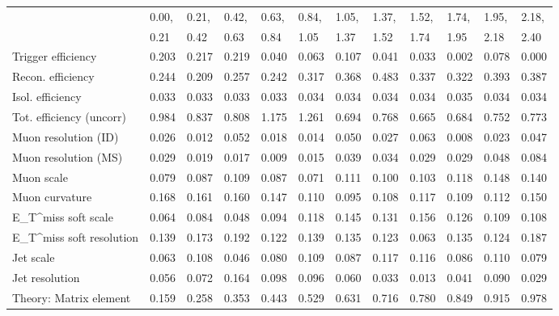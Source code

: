\begin{tabular}{l|p{0.6cm}p{0.6cm}p{0.6cm}p{0.6cm}p{0.6cm}p{0.6cm}p{0.6cm}p{0.6cm}p{0.6cm}p{0.6cm}p{0.6cm}}
\hline
   & 0.00, & 0.21, & 0.42, & 0.63, & 0.84, & 1.05, & 1.37, & 1.52, & 1.74, & 1.95, & 2.18,  \\ 
   & 0.21 & 0.42 & 0.63 & 0.84 & 1.05 & 1.37 & 1.52 & 1.74 & 1.95 & 2.18 & 2.40  \\ 
\hline
Trigger efficiency                       & 0.203 & 0.217 & 0.219 & 0.040 & 0.063 & 0.107 & 0.041 & 0.033 & 0.002 & 0.078 & 0.000 \\
Recon. efficiency                        & 0.244 & 0.209 & 0.257 & 0.242 & 0.317 & 0.368 & 0.483 & 0.337 & 0.322 & 0.393 & 0.387 \\
Isol. efficiency                         & 0.033 & 0.033 & 0.033 & 0.033 & 0.034 & 0.034 & 0.034 & 0.034 & 0.035 & 0.034 & 0.034 \\
Tot. efficiency (uncorr)                 & 0.984 & 0.837 & 0.808 & 1.175 & 1.261 & 0.694 & 0.768 & 0.665 & 0.684 & 0.752 & 0.773 \\
Muon resolution (ID)                     & 0.026 & 0.012 & 0.052 & 0.018 & 0.014 & 0.050 & 0.027 & 0.063 & 0.008 & 0.023 & 0.047 \\
Muon resolution (MS)                     & 0.029 & 0.019 & 0.017 & 0.009 & 0.015 & 0.039 & 0.034 & 0.029 & 0.029 & 0.048 & 0.084 \\
Muon scale                               & 0.079 & 0.087 & 0.109 & 0.087 & 0.071 & 0.111 & 0.100 & 0.103 & 0.118 & 0.148 & 0.140 \\
Muon curvature                           & 0.168 & 0.161 & 0.160 & 0.147 & 0.110 & 0.095 & 0.108 & 0.117 & 0.109 & 0.112 & 0.150 \\
E_{T}^{miss} soft scale                  & 0.064 & 0.084 & 0.048 & 0.094 & 0.118 & 0.145 & 0.131 & 0.156 & 0.126 & 0.109 & 0.108 \\
E_{T}^{miss} soft resolution             & 0.139 & 0.173 & 0.192 & 0.122 & 0.139 & 0.135 & 0.123 & 0.063 & 0.135 & 0.124 & 0.187 \\
Jet scale                                & 0.063 & 0.108 & 0.046 & 0.080 & 0.109 & 0.087 & 0.117 & 0.116 & 0.086 & 0.110 & 0.079 \\
Jet resolution                           & 0.056 & 0.072 & 0.164 & 0.098 & 0.096 & 0.060 & 0.033 & 0.013 & 0.041 & 0.090 & 0.029 \\
Theory: Matrix element                   & 0.159 & 0.258 & 0.353 & 0.443 & 0.529 & 0.631 & 0.716 & 0.780 & 0.849 & 0.915 & 0.978 \\

\end{tabular}
